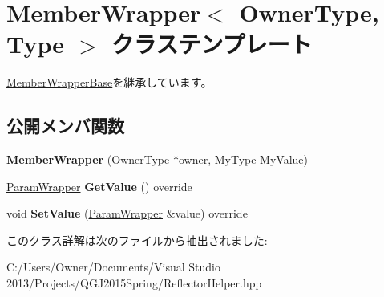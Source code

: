 \hypertarget{class_member_wrapper}{}\section{Member\+Wrapper$<$ Owner\+Type, Type $>$ クラステンプレート}
\label{class_member_wrapper}


\hyperlink{class_member_wrapper_base}{Member\+Wrapper\+Base}を継承しています。

\subsection*{公開メンバ関数}
\begin{DoxyCompactItemize}
\item 
{\bfseries Member\+Wrapper} (Owner\+Type $\ast$owner, My\+Type My\+Value)\hypertarget{class_member_wrapper_ac58e1d73c6eefa5d4222a9977af50cb9}{}\label{class_member_wrapper_ac58e1d73c6eefa5d4222a9977af50cb9}

\item 
\hyperlink{struct_param_wrapper}{Param\+Wrapper} {\bfseries Get\+Value} () override\hypertarget{class_member_wrapper_a04c61d8c8f4e4760fc125b1465b5b904}{}\label{class_member_wrapper_a04c61d8c8f4e4760fc125b1465b5b904}

\item 
void {\bfseries Set\+Value} (\hyperlink{struct_param_wrapper}{Param\+Wrapper} \&value) override\hypertarget{class_member_wrapper_abd7d0a1953cee1c0e046faa4a9463f65}{}\label{class_member_wrapper_abd7d0a1953cee1c0e046faa4a9463f65}

\end{DoxyCompactItemize}


このクラス詳解は次のファイルから抽出されました\+:\begin{DoxyCompactItemize}
\item 
C\+:/\+Users/\+Owner/\+Documents/\+Visual Studio 2013/\+Projects/\+Q\+G\+J2015\+Spring/Reflector\+Helper.\+hpp\end{DoxyCompactItemize}
